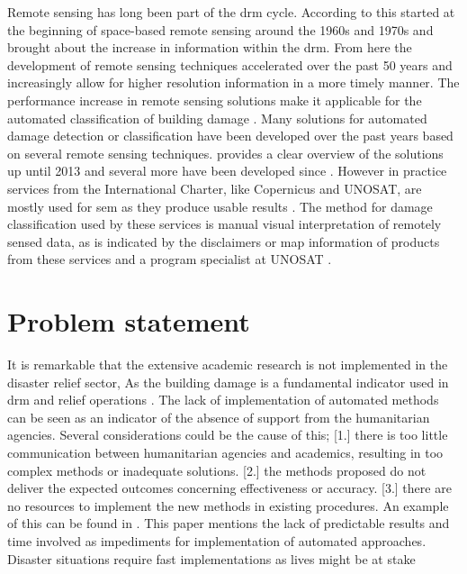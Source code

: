 \noindent Remote sensing has long been part of the \ac{drm} cycle. According to \citet{Kerle2015} this started at the beginning of space-based remote sensing around the 1960s and 1970s and brought about the increase in information within the \ac{drm}. From here the development of remote sensing techniques accelerated over the past 50 years and increasingly allow for higher resolution information in a more timely manner. The performance increase in remote sensing solutions make it applicable for the automated classification of building damage \citep{DellAcqua2012,Dong2013}. Many solutions for automated damage detection or classification have been developed over the past years based on several remote sensing techniques. \citet{Dong2013} provides a clear overview of the solutions up until 2013 and several more have been developed since \citep{Dominici2017,Sharma2017,Kakooei2017,Vetrivel2016b,Menderes2015}. However in practice services from the International Charter, like Copernicus and UNOSAT, are mostly used for \ac{sem} \citep{Voigt2016} as they produce usable results \citep{Kerle2010}. The method for damage classification used by these services is manual visual interpretation of remotely sensed data, as is indicated by the disclaimers or map information of products from these services and a program specialist at UNOSAT \citep{Cop2017,UNDAC2017}.


\section{Problem statement}
It is remarkable that the extensive academic research is not implemented in the disaster relief sector, As the building damage is a fundamental indicator used in \ac{drm} and relief operations \citep{Schweier2006}. The lack of implementation of automated methods can be seen as an indicator of the absence of support from the humanitarian agencies. Several considerations could be the cause of this; [1.] there is too little communication between humanitarian agencies and academics, resulting in too complex methods or inadequate solutions. [2.] the methods proposed do not deliver the expected outcomes concerning effectiveness or accuracy. [3.] there are no resources to implement the new methods in existing procedures. An example of this can be found in \citet{Ajmar2011}. This paper mentions the lack of predictable results and time involved as impediments for implementation of automated approaches. Disaster situations require fast implementations as lives might be at stake 


